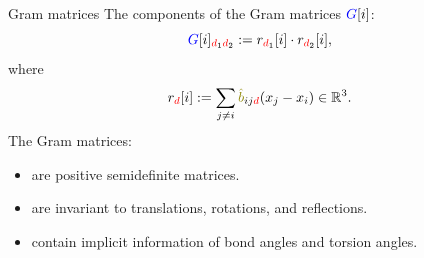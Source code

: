\documentclass{beamer}
\begin{document}
\begin{frame}{Gram matrices}
    The components of the Gram matrices ${\color{blue}G}[i]$:
    \begin{equation}
        {\color{blue}G}[i]_{{\color{red}d}_1{\color{red}d}_2} := r_{{\color{red}d}_1}[i] \cdot r_{{\color{red}d}_2}[i],
    \end{equation}
    where
    \begin{equation}
        r_{\color{red}d}[i] := \sum_{j \neq i} {\color{olive}\hat{b}}_{ij{\color{red}d}}(x_j - x_i) \in \mathbb{R}^3.
    \end{equation}
    The Gram matrices:
    \begin{itemize}
        \item are positive semidefinite matrices.
        \item are invariant to translations, rotations, and reflections.
        \item contain implicit information of bond angles and torsion angles.
    \end{itemize}
\end{frame}

\end{document}
